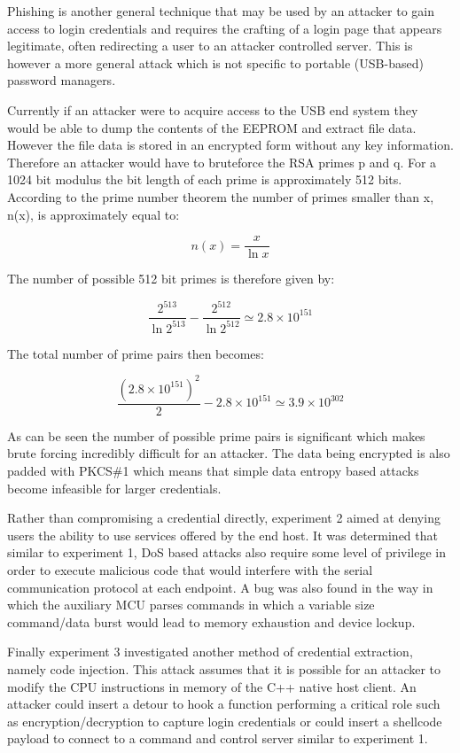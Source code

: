 Phishing is another general technique that may be used by an attacker to gain access to login credentials and requires the crafting of a login page that appears legitimate, often redirecting a user to an attacker controlled server. This is however a more general attack which is not specific to portable (USB-based) password managers.

Currently if an attacker were to acquire access to the USB end system they would be able to dump the contents of the EEPROM and extract file data. However the file data is stored in an encrypted form without any key information. Therefore an attacker would have to bruteforce the RSA primes p and q. For a 1024 bit modulus the bit length of each prime is approximately 512 bits. According to the prime number theorem \cite{wiki_prime} the number of primes smaller than x, n(x), is approximately equal to:

\[ n(x) = \dfrac{x}{\ln x}\]

The number of possible 512 bit primes is therefore given by:

\[\dfrac{2^{513}}{\ln 2^{513}}-\dfrac{2^{512}}{\ln 2^{512}}\simeq 2.8\times 10^{151}\]

The total number of prime pairs then becomes:

\[\dfrac{\left( 2.8\times 10^{151}\right) ^{2}}{2}-2.8\times 10^{151}\simeq 3.9\times 10^{302}\]

As can be seen the number of possible prime pairs is significant which makes brute forcing incredibly difficult for an attacker. The data being encrypted is also padded with PKCS\#1 which means that simple data entropy based attacks become infeasible for larger credentials. 

Rather than compromising a credential directly, experiment 2 aimed at denying users the ability to use services offered by the end host. It was determined that similar to experiment 1, DoS based attacks also require some level of privilege in order to execute malicious code that would interfere with the serial communication protocol at each endpoint. A bug was also found in the way in which the auxiliary MCU parses commands in which a variable size command/data burst would lead to memory exhaustion and device lockup. 

Finally experiment 3 investigated another method of credential extraction, namely code injection. This attack assumes that it is possible for an attacker to modify the CPU instructions in memory of the C++ native host client. An attacker could insert a detour to hook a function performing a critical role such as encryption/decryption to capture login credentials or could insert a shellcode payload to connect to a command and control server similar to experiment 1.

